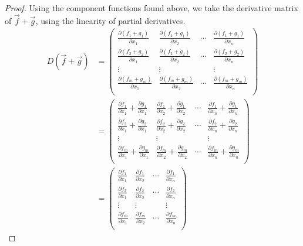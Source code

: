 \documentclass{ximera}
\begin{document}
\begin{proof}
Using the component functions found above, we take the derivative matrix of $\vec{f}+\vec{g}$, using the linearity of partial derivatives.
\begin{align*}
D(\vec{f}+\vec{g}) &=\left(\begin{array}{cccc}
\frac{\partial (f_1+g_1)}{\partial x_1} & \frac{\partial (f_1+g_1)}{\partial x_2} & \cdots &\frac{\partial (f_1+g_1)}{\partial x_n}\\
 \frac{\partial (f_2+g_2)}{\partial x_1} & \frac{\partial (f_2+g_2)}{\partial x_2} & \cdots &\frac{\partial (f_2+g_2)}{\partial x_n}\\
 \vdots & \vdots && \vdots\\
 \frac{\partial (f_m+g_m)}{\partial x_1} & \frac{\partial (f_m+g_m)}{\partial x_2} & \cdots &\frac{\partial (f_m+g_m)}{\partial x_n}\\
\end{array}\right)\\
&=\left(\begin{array}{cccc}
\frac{\partial f_1}{\partial x_1}+\frac{\partial g_1}{\partial x_1} & \frac{\partial f_1}{\partial x_2}+\frac{\partial g_1}{\partial x_2} & \cdots &\frac{\partial f_1}{\partial x_n}+\frac{\partial g_1}{\partial x_n}\\
\frac{\partial f_2}{\partial x_1}+\frac{\partial g_2}{\partial x_1} & \frac{\partial f_2}{\partial x_2}+\frac{\partial g_2}{\partial x_2} & \cdots &\frac{\partial f_2}{\partial x_n}+\frac{\partial g_2}{\partial x_n}\\
 \vdots & \vdots && \vdots\\
\frac{\partial f_m}{\partial x_1}+\frac{\partial g_m}{\partial x_1} & \frac{\partial f_m}{\partial x_2}+\frac{\partial g_m}{\partial x_2} & \cdots &\frac{\partial f_m}{\partial x_n}+\frac{\partial g_m}{\partial x_n}\\
\end{array}\right)\\
&=\left(\begin{array}{cccc}
\frac{\partial f_1}{\partial x_1} & \frac{\partial f_1}{\partial x_2} & \cdots &\frac{\partial f_1}{\partial x_n}\\
\frac{\partial f_2}{\partial x_1} & \frac{\partial f_2}{\partial x_2} & \cdots &\frac{\partial f_2}{\partial x_n}\\
 \vdots & \vdots && \vdots\\
\frac{\partial f_m}{\partial x_1} & \frac{\partial f_m}{\partial x_2} & \cdots &\frac{\partial f_m}{\partial x_n}\\
\end{array}\right)

\end{align*}
\end{proof}
\end{document}
